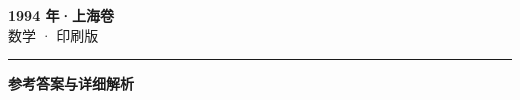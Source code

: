 \documentclass[zihao=5, a4paper]{ctexart}
\begin{document}
\begin{center}
  {\Large\bfseries 1994 年·上海卷}\\[4pt]
  {\large 数学 · 印刷版}
\end{center}
\medskip
{}

\par\bigskip\hrule\bigskip
{}
\begin{center}{\large\bfseries 参考答案与详细解析}\end{center}
\smallskip

\end{document}
